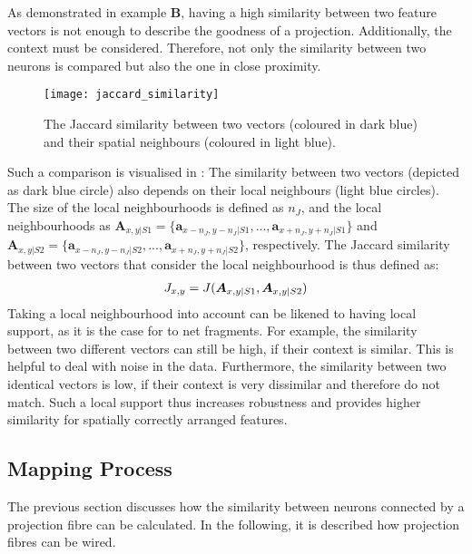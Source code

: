 As demonstrated in  example $\boldsymbol{B}$, having a high similarity between two feature vectors is not enough to describe the goodness of a projection.
Additionally, the context must be considered.
Therefore, not only the similarity between two neurons is compared but also the one in close proximity.
\begin{figure}[h]
    \centering
    \texttt{[image: jaccard\_similarity]}
    \caption[Similarity between two vectors and their spatial neighbours]{The Jaccard similarity between two vectors (coloured in dark blue) and their spatial neighbours (coloured in light blue).}
\end{figure}
Such a comparison is visualised in :
The similarity between two vectors (depicted as dark blue circle) also depends on their local neighbours (light blue circles).
The size of the local neighbourhoods is defined as $n_J$, and the local neighbourhoods as  $\boldsymbol{A}_{x,y|S1} = \{ \boldsymbol{a}_{x-n_J,y-n_J|S1}, ...,  \boldsymbol{a}_{x+n_J,y+n_J|S1}\}$  and $\boldsymbol{A}_{x,y|S2} = \{ \boldsymbol{a}_{x-n_J,y-n_J|S2}, ...,  \boldsymbol{a}_{x+n_J,y+n_J|S2}\}$, respectively.
The Jaccard similarity between two vectors that consider the local neighbourhood is thus defined as:
%
\begin{align}\eqlbl{jaccard2}
	J_{x,y} = J(\boldsymbol{A}_{x,y|S1}, \boldsymbol{A}_{x,y|S2})
\end{align}
%
Taking a local neighbourhood into account can be likened to having local support, as it is the case for to net fragments. For example, the similarity between two different vectors can still be high, if their context is similar. This is helpful to deal with noise in the data.
Furthermore, the similarity between two identical vectors is low, if their context is very dissimilar and therefore do not match.
Such a local support thus increases robustness and provides higher similarity for spatially correctly arranged features.













\subsection{Mapping Process}
The previous section discusses how the similarity between neurons connected by a projection fibre can be calculated.
In the following, it is described how projection fibres can be wired.

